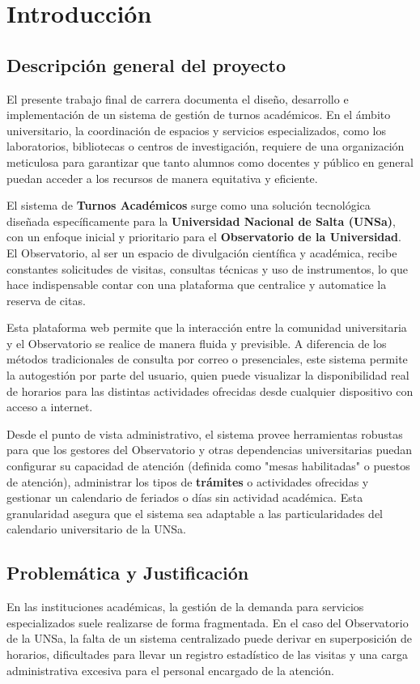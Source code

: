 \chapter{Introducción}

\section{Descripción general del proyecto}
El presente trabajo final de carrera documenta el diseño, desarrollo e implementación de un sistema de gestión de turnos académicos. En el ámbito universitario, la coordinación de espacios y servicios especializados, como los laboratorios, bibliotecas o centros de investigación, requiere de una organización meticulosa para garantizar que tanto alumnos como docentes y público en general puedan acceder a los recursos de manera equitativa y eficiente.

El sistema de \textbf{Turnos Académicos} surge como una solución tecnológica diseñada específicamente para la \textbf{Universidad Nacional de Salta (UNSa)}, con un enfoque inicial y prioritario para el \textbf{Observatorio de la Universidad}. El Observatorio, al ser un espacio de divulgación científica y académica, recibe constantes solicitudes de visitas, consultas técnicas y uso de instrumentos, lo que hace indispensable contar con una plataforma que centralice y automatice la reserva de citas.

Esta plataforma web permite que la interacción entre la comunidad universitaria y el Observatorio se realice de manera fluida y previsible. A diferencia de los métodos tradicionales de consulta por correo o presenciales, este sistema permite la autogestión por parte del usuario, quien puede visualizar la disponibilidad real de horarios para las distintas actividades ofrecidas desde cualquier dispositivo con acceso a internet.

Desde el punto de vista administrativo, el sistema provee herramientas robustas para que los gestores del Observatorio y otras dependencias universitarias puedan configurar su capacidad de atención (definida como "mesas habilitadas" o puestos de atención), administrar los tipos de \textbf{trámites} o actividades ofrecidas y gestionar un calendario de feriados o días sin actividad académica. Esta granularidad asegura que el sistema sea adaptable a las particularidades del calendario universitario de la UNSa.

\section{Problemática y Justificación}
En las instituciones académicas, la gestión de la demanda para servicios especializados suele realizarse de forma fragmentada. En el caso del Observatorio de la UNSa, la falta de un sistema centralizado puede derivar en superposición de horarios, dificultades para llevar un registro estadístico de las visitas y una carga administrativa excesiva para el personal encargado de la atención.

